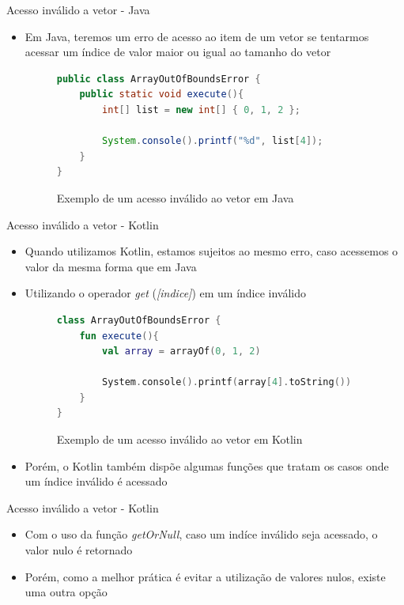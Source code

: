 \documentclass[brazilian]{beamer}
\begin{document}
\begin{frame}[fragile]{Acesso inválido a vetor - Java}
    \begin{itemize}
        \item Em Java, teremos um erro de acesso ao item de um vetor se tentarmos acessar um índice de valor maior ou igual ao tamanho do vetor
        \begin{figure}[H]
            \centering
            \begin{lstlisting}[language=Java]
public class ArrayOutOfBoundsError {
    public static void execute(){
        int[] list = new int[] { 0, 1, 2 };

        System.console().printf("%d", list[4]);
    }
}
            \end{lstlisting}
            \caption{Exemplo de um acesso inválido ao vetor em Java}
            \label{fig:java_invalid_array_access}
        \end{figure}
    \end{itemize}
\end{frame}

\begin{frame}[fragile]{Acesso inválido a vetor - Kotlin}
    \begin{itemize}
        \item Quando utilizamos Kotlin, estamos sujeitos ao mesmo erro, caso acessemos o valor da mesma forma que em Java
        \item Utilizando o operador \emph{get} (\emph{[indice]}) em um índice inválido
        \begin{figure}[H]
            \centering
            \begin{lstlisting}[language=Kotlin]
class ArrayOutOfBoundsError {
    fun execute(){
        val array = arrayOf(0, 1, 2)

        System.console().printf(array[4].toString())
    }
}
            \end{lstlisting}
            \caption{Exemplo de um acesso inválido ao vetor em Kotlin}
            \label{fig:kotlin_invalid_array_access}
        \end{figure}
        \item Porém, o Kotlin também dispõe algumas funções que tratam os casos onde um índice inválido é acessado
    \end{itemize}
\end{frame}

\begin{frame}{Acesso inválido a vetor - Kotlin}
    \begin{itemize}
        \item Com o uso da função \emph{getOrNull}, caso um indíce inválido seja acessado, o valor nulo é retornado
        \item Porém, como a melhor prática é evitar a utilização de valores nulos, existe uma outra opção
    \end{itemize}
\end{frame}
\end{document}
